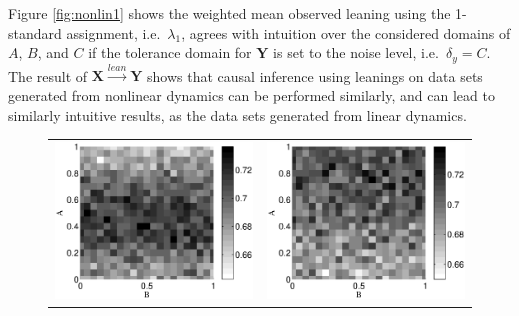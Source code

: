 \documentclass[a4paper,11pt,twocolumn]{article}
\begin{document}
Figure \ref{fig:nonlin1} shows the weighted mean observed leaning using the 1-standard assignment, i.e.\ $\lambda_1$, agrees with intuition over the considered domains of $A$, $B$, and $C$ if the tolerance domain for $\mathbf{Y}$ is set to the noise level, i.e.\ $\delta_y = C$.  The result of $\mathbf{X}\xrightarrow{lean}\mathbf{Y}$ shows that causal inference using leanings on data sets generated from nonlinear dynamics can be performed similarly, and can lead to similarly intuitive results, as the data sets generated from linear dynamics.
\begin{figure}[ht]
\begin{tabular}{cc}
\includegraphics[scale=0.30]{NonlinearCyclicexample_BxytolC02.eps} &
\includegraphics[scale=0.30]{NonlinearCyclicexample_BxytolC04.eps} \\

\end{tabular}
\end{figure}
\end{document}
